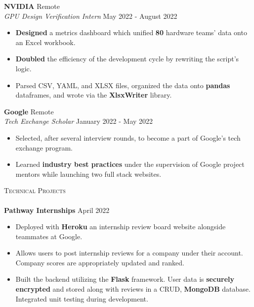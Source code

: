 \documentclass[a4paper]{article}
\newcommand{\lineunder} {
    \vspace*{-8pt} \\
    \hspace*{-18pt} \hrulefill \\
}
\newcommand{\header} [1] {
    {\hspace*{-18pt}\vspace*{6pt} \textsc{#1}}
    \vspace*{-6pt} \lineunder
}
\begin{document}
\textbf{NVIDIA} \hfill Remote\\
\textit{GPU Design Verification Intern} \hfill May 2022 - August 2022\\
\vspace{-2mm}
\begin{itemize} \itemsep -1pt
	\item \textbf{Designed} a metrics dashboard which unified \textbf{80} hardware teams' data onto an Excel workbook.
	\item \textbf{Doubled} the efficiency of the development cycle by rewriting the script's logic. 
	\item Parsed CSV, YAML, and XLSX files, organized the data onto \textbf{pandas} dataframes, and wrote via the \textbf{XlsxWriter} library. 
\end{itemize}
\vspace{-2mm}

\textbf{Google} \hfill Remote\\
\textit{Tech Exchange Scholar} \hfill January 2022 - May 2022\\
\vspace{-2mm}
\begin{itemize} \itemsep -1pt
	\item Selected, after several interview rounds, to become a part of Google's tech exchange program. 
	\item Learned \textbf{industry best practices} under the supervision of Google project mentors while launching two full stack websites.
\end{itemize}

\header{Technical Projects}
{\textbf{Pathway Internships}} \hfill April 2022 \\
\vspace{-2mm}
\begin{itemize} \itemsep -1pt
\item Deployed with \textbf{Heroku} an internship review board website alongside teammates at Google.

\item Allows users to post internship reviews for a company under their account. Company scores are appropriately updated and ranked.

\item Built the backend utilizing the \textbf{Flask} framework. User data is \textbf{securely encrypted} and stored along with reviews in a CRUD, \textbf{MongoDB} database. Integrated unit testing during development.
\end{itemize}
\end{document}
